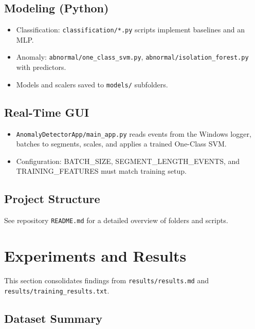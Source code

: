 \documentclass[
  11pt,
  a4paper,
]{article}
\providecommand{\tightlist}{%
  \setlength{\itemsep}{0pt}\setlength{\parskip}{0pt}}
\begin{document}
\subsection{Modeling (Python)}\label{modeling-python}

\begin{itemize}
\tightlist
\item
  Classification: \texttt{classification/*.py} scripts implement
  baselines and an MLP.
\item
  Anomaly: \texttt{abnormal/one\_class\_svm.py},
  \texttt{abnormal/isolation\_forest.py} with predictors.
\item
  Models and scalers saved to \texttt{models/} subfolders.
\end{itemize}

\subsection{Real-Time GUI}\label{real-time-gui}

\begin{itemize}
\tightlist
\item
  \texttt{AnomalyDetectorApp/main\_app.py} reads events from the Windows
  logger, batches to segments, scales, and applies a trained One-Class
  SVM.
\item
  Configuration: BATCH\_SIZE, SEGMENT\_LENGTH\_EVENTS, and
  TRAINING\_FEATURES must match training setup.
\end{itemize}

\subsection{Project Structure}\label{project-structure}

See repository \texttt{README.md} for a detailed overview of folders and
scripts.

\section{Experiments and Results}\label{experiments-and-results}

This section consolidates findings from \texttt{results/results.md} and
\texttt{results/training\_results.txt}.

\subsection{Dataset Summary}\label{dataset-summary}
\end{document}
